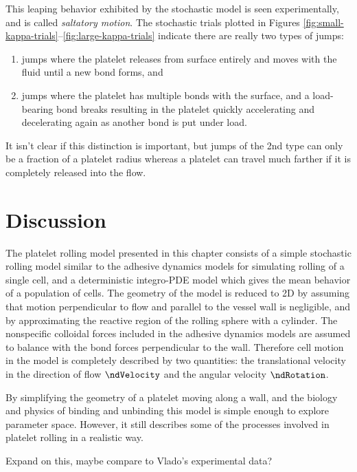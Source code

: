 This leaping behavior exhibited by the stochastic model is
seen experimentally, and is called \emph{saltatory
  motion}. The stochastic trials plotted in Figures
\ref{fig:small-kappa-trials}--\ref{fig:large-kappa-trials} indicate
there are really two types of jumps:
\begin{enumerate}
\item jumps where the platelet releases from surface entirely and
  moves with the fluid until a new bond forms, and
\item jumps where the platelet has multiple bonds with the surface,
  and a load-bearing bond breaks resulting in the platelet quickly
  accelerating and decelerating again as another bond is put under load.
\end{enumerate}
It isn't clear if this distinction is important, but jumps of the 2nd
type can only be a fraction of a platelet radius whereas a platelet
can travel much farther if it is completely released into the flow.

\section{Discussion}
\label{sec:discussion}

The platelet rolling model presented in this chapter consists of a
simple stochastic rolling model similar to the adhesive dynamics
models for simulating rolling of a single cell, and a deterministic
integro-PDE model which gives the mean behavior of a population of
cells. The geometry of the model is reduced to 2D by assuming that
motion perpendicular to flow and parallel to the vessel wall is
negligible, and by approximating the reactive region of the rolling
sphere with a cylinder. The nonspecific colloidal forces included in
the adhesive dynamics models \cite{Hammer2014} are assumed to balance
with the bond forces perpendicular to the wall. Therefore cell motion
in the model is completely described by two quantities: the
translational velocity in the direction of flow $\ndVelocity$ and the
angular velocity $\ndRotation$.

By simplifying the geometry of a platelet moving along a wall, and the
biology and physics of binding and unbinding this model is simple
enough to explore parameter space. However, it still describes some of
the processes involved in platelet rolling in a realistic way.

{\color{red} Expand on this, maybe compare to Vlado's experimental data?}

